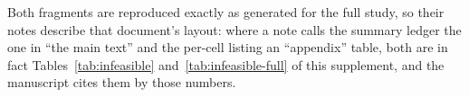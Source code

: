 Both fragments are reproduced exactly as generated for the full study, so their
notes describe that document's layout: where a note calls the summary ledger
the one in ``the main text'' and the per-cell listing an ``appendix'' table, both
are in fact Tables~\ref{tab:infeasible} and~\ref{tab:infeasible-full} of this
supplement, and the manuscript cites them by those numbers.


\bigskip

